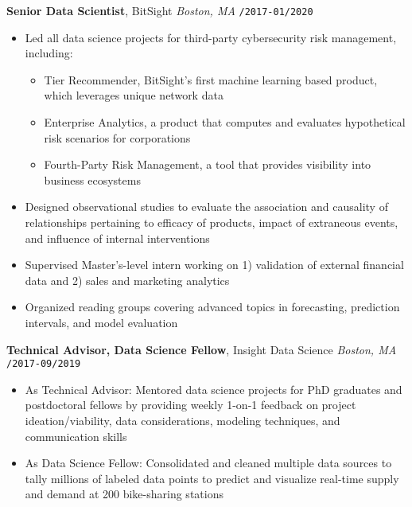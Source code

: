 \documentclass[10pt,english]{report}
\begin{document}
\vspace{1mm}

\textbf{Senior Data Scientist}, BitSight \hfill \textit{Boston, MA} \texttt{/2017-01/2020}
\begin{itemize}
		\item Led all data science projects for third-party cybersecurity risk management, including:
		\begin{itemize}
				\item Tier Recommender, BitSight's first machine learning based product, which leverages unique network data
				\item Enterprise Analytics, a product that computes and evaluates hypothetical risk scenarios for corporations
				\item Fourth-Party Risk Management, a tool that provides visibility into business ecosystems
		\end{itemize}
    \item Designed observational studies to evaluate the association and causality of relationships pertaining to efficacy of products, impact of extraneous events, and influence of internal interventions
		\item Supervised Master's-level intern working on 1) validation of external financial data and 2) sales and marketing analytics
		\item Organized reading groups covering advanced topics in forecasting, prediction intervals, and model evaluation
\end{itemize}

\vspace{1mm}

\textbf{Technical Advisor, Data Science Fellow}, Insight Data Science \hfill \textit{Boston, MA} \texttt{/2017-09/2019}
\begin{itemize}
    \item As Technical Advisor: Mentored data science projects for PhD graduates and postdoctoral fellows by providing weekly 1-on-1 feedback on project ideation/viability, data considerations, modeling techniques, and communication skills
    \item As Data Science Fellow: Consolidated and cleaned multiple data sources to tally millions of labeled data points to predict and visualize real-time supply and demand at 200 bike-sharing stations
\end{itemize}
\end{document}
